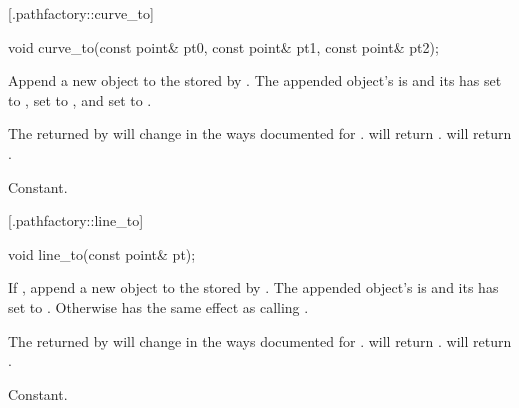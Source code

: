  [\iotwod.pathfactory::curve_to] {}

%
%
\begin{itemdecl}
void curve_to(const point& pt0, const point& pt1, const point& pt2);
\end{itemdecl}
\begin{itemdescr}
	\pnum
	\effects
	Append a new  object to the  stored by 
	. The appended object's  is 
	 and its  has 
	 set to , 
	 set to , and 
	 set to .
	
	\pnum
	\postcondition
	The  returned by  will change 
	in the ways documented for .
	 will return . 
	 will return .
	
	\pnum
	\complexity
	Constant.
\end{itemdescr}

 [\iotwod.pathfactory::line_to] {}

%
%
\begin{itemdecl}
void line_to(const point& pt);
\end{itemdecl}
\begin{itemdescr}
	\pnum
	\effects
	If , append a new  
	object to the  stored by . The appended 
	object's  is  and its 
	 has  set to 
	. Otherwise has the same effect as calling .
	
	\pnum
	\postconditions
	The  returned by  will change 
	in the ways documented for .
	 will return . 
	 will return .
	
	\pnum
	\complexity
	Constant.
\end{itemdescr}

